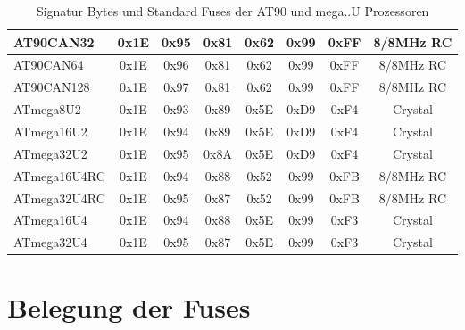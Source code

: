 \begin{table}[H]
\begin{center}
\begin{tabular}{| l | c | c | c || c | c | c | c |}
    \hline
AT90CAN32 & 0x1E & 0x95  & 0x81 & 0x62 & 0x99 & 0xFF & 8/8MHz RC \\
    \hline
AT90CAN64 & 0x1E & 0x96  & 0x81 & 0x62 & 0x99 & 0xFF & 8/8MHz RC \\
    \hline
AT90CAN128 & 0x1E & 0x97  & 0x81 & 0x62 & 0x99 & 0xFF & 8/8MHz RC \\
    \hline
ATmega8U2  & 0x1E & 0x93  & 0x89 & 0x5E & 0xD9 & 0xF4 & Crystal \\
    \hline
ATmega16U2 & 0x1E & 0x94  & 0x89 & 0x5E & 0xD9 & 0xF4 & Crystal \\
    \hline
ATmega32U2 & 0x1E & 0x95  & 0x8A & 0x5E & 0xD9 & 0xF4 & Crystal \\
    \hline
ATmega16U4RC & 0x1E & 0x94  & 0x88 & 0x52 & 0x99 & 0xFB & 8/8MHz RC \\
    \hline
ATmega32U4RC & 0x1E & 0x95  & 0x87 & 0x52 & 0x99 & 0xFB & 8/8MHz RC \\
    \hline
ATmega16U4 & 0x1E & 0x94  & 0x88 & 0x5E & 0x99 & 0xF3 & Crystal \\
    \hline
ATmega32U4 & 0x1E & 0x95  & 0x87 & 0x5E & 0x99 & 0xF3 & Crystal \\
    \hline
    \end{tabular}
  \end{center}
  \caption{Signatur Bytes und Standard Fuses der AT90 und mega..U Prozessoren}
  \label{tab:at90Signature}
\end{table}

\section{Belegung der Fuses}


